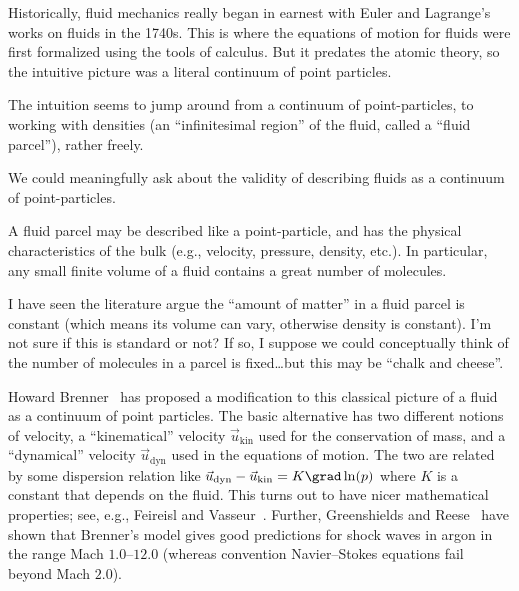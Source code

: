 \begin{node}\label{fluids:describing-0009}%
Historically, fluid mechanics really began in earnest with Euler and
Lagrange's works on fluids in the 1740s. This is where the equations of
motion for fluids were first formalized using the tools of calculus. But
it predates the atomic theory, so the intuitive picture was a literal
continuum of point particles.

The intuition seems to jump around from a continuum of point-particles,
to working with densities (an ``infinitesimal region'' of the fluid,
called a ``fluid parcel''), rather freely.

We could meaningfully ask about the validity of describing fluids as a
continuum of point-particles.

\begin{node}\label{fluids:describing-000A}%
A fluid parcel may be described like a point-particle, and has the
physical characteristics of the bulk (e.g., velocity, pressure, density,
etc.). In particular, any small finite volume of a fluid contains a
great number of molecules.

\begin{node}[Remark]\label{fluids:describing-000B}%
I have seen the literature argue the ``amount of matter'' in a fluid
parcel is constant (which means its volume can vary, otherwise density
is constant). I'm not sure if this is standard or not? If so, I suppose
we could conceptually think of the number of molecules in a parcel is
fixed\dots but this may be ``chalk and cheese''.
\end{node}

\begin{node}\label{fluids:describing-000H}%
Howard Brenner~\cite{brenner2005kinematics,brenner2005navier,brenner2006fluid} has proposed a modification to this classical picture of
a fluid as a continuum of point particles. The basic alternative has two
different notions of velocity, a ``kinematical'' velocity
$\vec{u}_{\text{kin}}$ used for the conservation of mass, and a
``dynamical'' velocity $\vec{u}_{\text{dyn}}$ used in the equations
of motion. The two are related by some dispersion relation like
$\vec{u}_{\text{dyn}}-\vec{u}_{\text{kin}}=K\grad\ln(p)$ where $K$ is a
constant that depends on the fluid. This turns out to have nicer
mathematical properties; see, e.g., Feireisl and Vasseur~\cite{feireisl2010new}.
Further, Greenshields and Reese~\cite{greenshields2007structure} have
shown that Brenner's model gives good predictions for shock waves in
argon in the range Mach $1.0$--$12.0$ (whereas convention Navier--Stokes
equations fail beyond Mach $2.0$).
\end{node}
\end{node}


\end{node}
